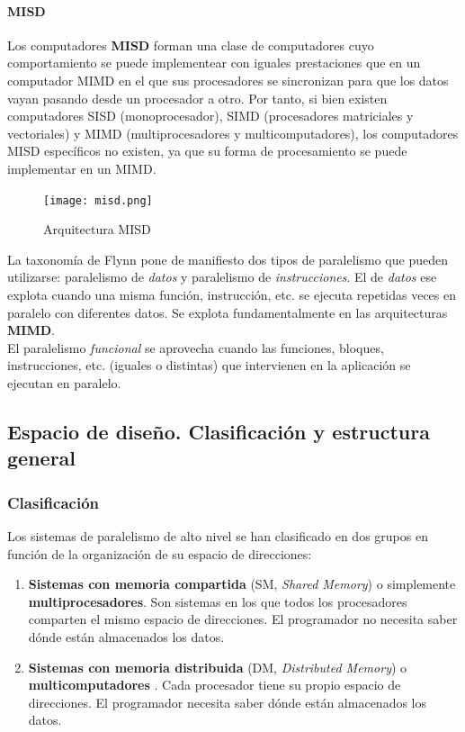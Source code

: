 \documentclass[12pt,spanish]{article}
\begin{document}
\paragraph{MISD}

Los computadores \textbf{MISD} forman una clase de computadores cuyo comportamiento se puede implementear con iguales prestaciones que en un computador MIMD en el que sus procesadores se sincronizan para que los datos vayan pasando desde un procesador a otro. Por tanto, si bien existen computadores SISD (monoprocesador), SIMD (procesadores matriciales y vectoriales) y MIMD (multiprocesadores y multicomputadores), los computadores MISD específicos no existen, ya que su forma de procesamiento se puede implementar en un MIMD.

\begin{figure}[H]
\centering
\texttt{[image: misd.png]}
\caption{Arquitectura MISD}
\end{figure}

La taxonomía de Flynn pone de manifiesto dos tipos de paralelismo que pueden utilizarse: paralelismo de \emph{datos} y paralelismo de \emph{instrucciones}. El de \emph{datos} ese explota cuando una misma función, instrucción, etc. se ejecuta repetidas veces en paralelo con diferentes datos. Se explota fundamentalmente en las arquitecturas \textbf{MIMD}.\\
El paralelismo \emph{funcional} se aprovecha cuando las funciones, bloques, instrucciones, etc. (iguales o distintas) que intervienen en la aplicación se ejecutan en paralelo. 

\subsection{Espacio de diseño. Clasificación y estructura general}
\subsubsection{Clasificación}
Los sistemas de paralelismo de alto nivel se han clasificado en dos grupos en función de la organización de su espacio de direcciones:
\begin{enumerate}
\item \textbf{Sistemas con memoria compartida} (SM, \textit{Shared Memory}) o simplemente \textbf{multiprocesadores}. Son sistemas en los que todos los procesadores comparten el mismo espacio de direcciones. El programador no necesita saber dónde están almacenados los datos.
\item \textbf{Sistemas con memoria distribuida} (DM, \textit{Distributed Memory}) o \textbf{multicomputadores} . Cada procesador tiene su propio espacio de direcciones. El programador necesita saber dónde están almacenados los datos.
\end{enumerate}
\end{document}
